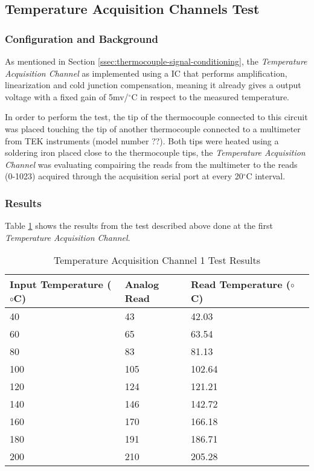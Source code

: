 \subsection{Temperature Acquisition Channels Test}\label{sec:temperature-acquisition-channels-test}
	
	\subsubsection{Configuration and Background}

		As mentioned in Section \ref{ssec:thermocouple-signal-conditioning}, the \textit{Temperature Acquisition Channel} as implemented using a IC that performs amplification, linearization and cold junction compensation, meaning it already gives a output voltage with a fixed gain of 5mv/$^{\circ}$C in respect to the measured temperature.
		\par
		In order to perform the test, the tip of the thermocouple connected to this circuit was placed touching the tip of another thermocouple connected to a multimeter from TEK instruments (model number ??). Both tips were heated using a soldering iron placed close to the thermocouple tips, the \textit{Temperature Acquisition Channel} was evaluating compairing the reads from the multimeter to the reads (0-1023) acquired through the acquisition serial port at every 20$^{\circ}$C interval.

	\subsubsection{Results}


			Table \ref{table:results-temp1-test} shows the results from the test described above done at the first \textit{Temperature Acquisition Channel}.

				\begin{table}[h!]
					\begin{tabular}{|l|l|l|l|}
						\hline
						\textbf{Input Temperature (${\circ}$C)} & \textbf{Analog Read} & \textbf{Read Temperature (${\circ}$C)} \\ \hline
						40 & 43 & 42.03 \\ \hline
						60 & 65 & 63.54 \\ \hline
						80 & 83 & 81.13 \\ \hline
						100 & 105 & 102.64 \\ \hline
						120 & 124 & 121.21 \\ \hline
						140 & 146 & 142.72 \\ \hline
						160 & 170 & 166.18 \\ \hline
						180 & 191 & 186.71 \\ \hline
						200 & 210 & 205.28 \\ \hline
					\end{tabular}
					\caption{Temperature Acquisition Channel 1 Test Results}
					\label{table:results-temp1-test}
				\end{table}

